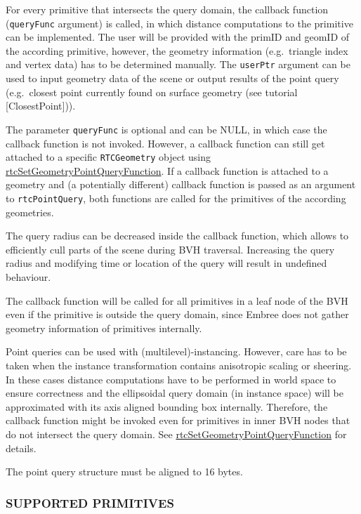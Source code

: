 For every primitive that intersects the query domain, the callback
function (\texttt{queryFunc} argument) is called, in which distance
computations to the primitive can be implemented. The user will be
provided with the primID and geomID of the according primitive, however,
the geometry information (e.g.~triangle index and vertex data) has to be
determined manually. The \texttt{userPtr} argument can be used to input
geometry data of the scene or output results of the point query
(e.g.~closest point currently found on surface geometry (see tutorial
{[}ClosestPoint{]})).

The parameter \texttt{queryFunc} is optional and can be NULL, in which
case the callback function is not invoked. However, a callback function
can still get attached to a specific \texttt{RTCGeometry} object using
\hyperref[rtcsetgeometrypointqueryfunction]{rtcSetGeometryPointQueryFunction}.
If a callback function is attached to a geometry and (a potentially
different) callback function is passed as an argument to
\texttt{rtcPointQuery}, both functions are called for the primitives of
the according geometries.

The query radius can be decreased inside the callback function, which
allows to efficiently cull parts of the scene during BVH traversal.
Increasing the query radius and modifying time or location of the query
will result in undefined behaviour.

The callback function will be called for all primitives in a leaf node
of the BVH even if the primitive is outside the query domain, since
Embree does not gather geometry information of primitives internally.

Point queries can be used with (multilevel)-instancing. However, care
has to be taken when the instance transformation contains anisotropic
scaling or sheering. In these cases distance computations have to be
performed in world space to ensure correctness and the ellipsoidal query
domain (in instance space) will be approximated with its axis aligned
bounding box internally. Therefore, the callback function might be
invoked even for primitives in inner BVH nodes that do not intersect the
query domain. See
\hyperref[rtcsetgeometrypointqueryfunction]{rtcSetGeometryPointQueryFunction}
for details.

The point query structure must be aligned to 16 bytes.

\subsubsection{SUPPORTED PRIMITIVES}\label{supported-primitives}

